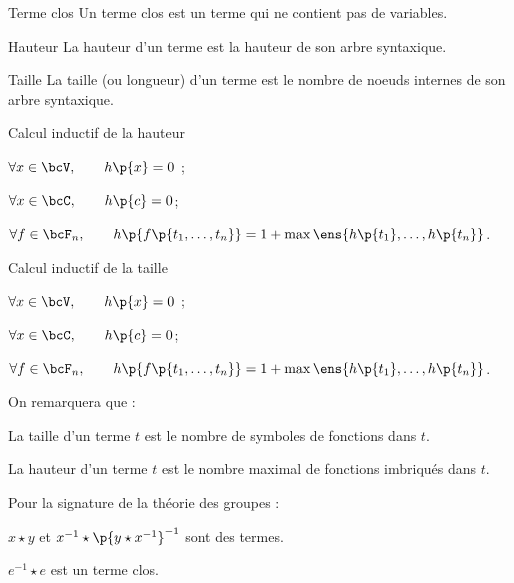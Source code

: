     \begin{definition}{Terme clos}{}
        Un terme clos est un terme qui ne contient pas de variables.
    \end{definition}
    
    \begin{definition}{Hauteur}{}
        La hauteur d'un terme est la hauteur de son arbre syntaxique.
    \end{definition}
    
    \begin{definition}{Taille}{}
        La taille (ou longueur) d'un terme est le nombre de noeuds internes de son arbre syntaxique.
    \end{definition}
    
    \begin{property}{Calcul inductif de la hauteur}{}
        \begin{enumerate}
            \itast $\forall x \in \bcV,\qquad h\p{x} = 0$ ;
            
            \itast $\forall x \in \bcC, \qquad h\p{c} = 0$;
            
            \itast $\forall f \in \bcF_n,\qquad h\p{f\p{t_1, \dots, t_n}} = 1 + \max\ens{h\p{t_1}, \dots, h\p{t_n}}$.
        \end{enumerate}
    \end{property}
    
    \begin{property}{Calcul inductif de la taille}{}
        \begin{enumerate}
            \itast $\forall x \in \bcV,\qquad h\p{x} = 0$ ;
            
            \itast $\forall x \in \bcC, \qquad h\p{c} = 0$;
            
            \itast $\forall f \in \bcF_n,\qquad h\p{f\p{t_1, \dots, t_n}} = 1 + \max\ens{h\p{t_1}, \dots, h\p{t_n}}$.
        \end{enumerate}
    \end{property}
    
    On remarquera que :
    \begin{enumerate}
        \itt La taille d'un terme $t$ est le nombre de symboles de fonctions dans $t$.
        
        \itt La hauteur d'un terme $t$ est le nombre maximal de fonctions imbriqués dans $t$.
    \end{enumerate}
    
    \begin{example}{}{}
        Pour la signature de la théorie des groupes :
        \begin{enumerate}
            \itt $x \star y$ et $x^{-1} \star \p{y \star x^{-1}}^{-1}$ sont des termes.
            
            \itt $e^{-1} \star e$ est un terme clos.
        \end{enumerate}
    \end{example}
    
